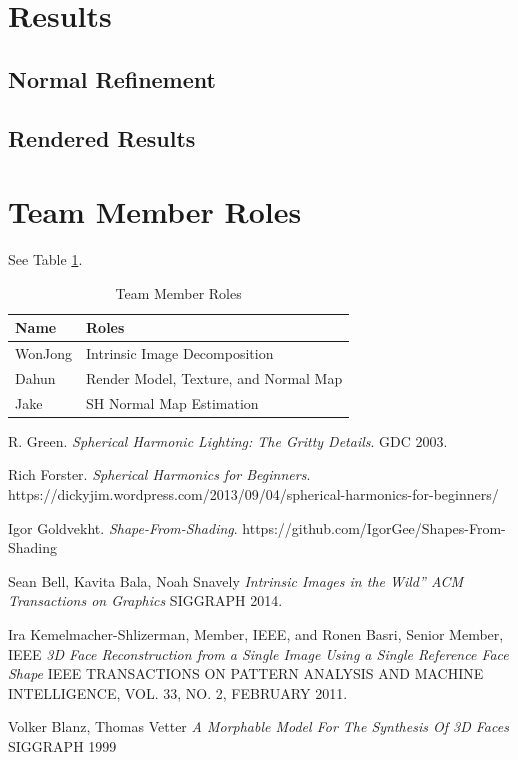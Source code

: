 \documentclass[10pt,twocolumn,letterpaper]{article}
\begin{document}
\section{Results}
\subsection{Normal Refinement}
\subsection{Rendered Results}


\section{Team Member Roles}
See Table \ref{tab:roles}.
\begin{table}[!h]
	\begin{tabular}{l|l}
		\textbf{Name} & Roles \\
		\hline
		WonJong & Intrinsic Image Decomposition \\
		Dahun & Render Model, Texture, and Normal Map \\
		Jake & SH Normal Map Estimation \\
		\hline
	\end{tabular}
	\caption{Team Member Roles}
	\label{tab:roles}
\end{table}

\begin{thebibliography}{1}
	R. Green.
	\textit{Spherical Harmonic Lighting: The Gritty Details}. 
	GDC 2003.
	
	Rich Forster.
	\textit{Spherical Harmonics for Beginners}. 
	https://dickyjim.wordpress.com/2013/09/04/spherical-harmonics-for-beginners/
	
	
	Igor Goldvekht. 
	\textit{Shape-From-Shading}. 
	https://github.com/IgorGee/Shapes-From-Shading
    
    
    Sean Bell, Kavita Bala, Noah Snavely
    \textit{Intrinsic Images in the Wild” ACM Transactions on Graphics}
    SIGGRAPH 2014.
    
    Ira Kemelmacher-Shlizerman, Member, IEEE, and Ronen Basri, Senior Member, IEEE \textit{3D Face Reconstruction from a Single Image Using a Single Reference Face Shape}
    IEEE TRANSACTIONS ON PATTERN ANALYSIS AND MACHINE INTELLIGENCE, VOL. 33, NO. 2, FEBRUARY 2011.
    
    Volker Blanz, Thomas Vetter
    \textit{A Morphable Model For The Synthesis Of 3D Faces}
    SIGGRAPH 1999
    
\end{thebibliography}
\end{document}
